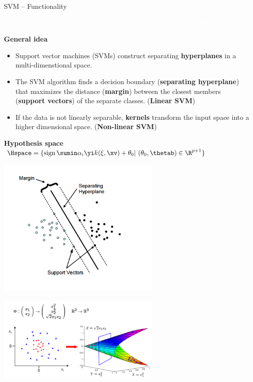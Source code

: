 \documentclass[11pt,compress,t,notes=noshow, xcolor=table]{beamer}
\newcommand{\maketag}[1]{\colorbox{highlightcol}{\textcolor{white}
{\MakeUppercase{#1}}}}
\newcommand{\highlight}[1]{\textcolor{highlightcol}{\textbf{#1}}}
\begin{document}
\begin{frame}{SVM -- Functionality}

\footnotesize

\maketag{SUPERVISED}
\maketag{PARAMETRIC}
\maketag{NON-PARAMETRIC}
\maketag{WHITE-BOX}

\medskip

\highlight{General idea} ~~
\begin{itemize}

\item Support vector machines (SVMs) construct separating \textbf{hyperplanes} in a multi-dimenstional space.  

\item The SVM algorithm finds a decision boundary (\textbf{separating hyperplane}) that maximizes the distance (\textbf{margin}) between the closest members (\textbf{support vectors}) of the separate classes. (\textbf{Linear SVM})

\item If the data is not linearly separable, \textbf{kernels} transform the input space into a higher dimensional space. (\textbf{Non-linear SVM})

\end{itemize}

\medskip


\highlight{Hypothesis space} ~~
\textcolor{red}{$\Hspace = \{ \operatorname{sign}\sumin \alpha_i \yi k(\xi, \xv)  + \theta_0  |\ (\theta_0, \thetab) \in \R^{p+1} \} $}

\medskip
 \footnotesize
 \begin{minipage}{0.4\textwidth}
\centering
 \includegraphics[width=0.6\textwidth]{figure/svm_wording.png}
 \end{minipage}
  \normalsize
 \begin{minipage}{0.5\textwidth}
 \centering
 \includegraphics[width=0.6\textwidth]{figure/svm_kernel.PNG}
   
 \end{minipage}

\end{frame}
\end{document}
